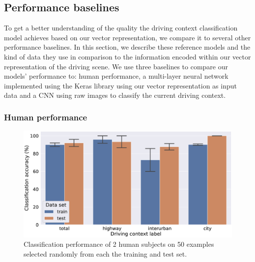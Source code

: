 \subsection{Performance baselines}%
\label{subsec:performance_baselines}

To get a better understanding of the quality the driving context classification model achieves based on our vector representation, we compare it to several other performance baselines.
In this section, we describe these reference models and the kind of data they use in comparison to the information encoded within our vector representation of the driving scene.
We use three baselines to compare our models' performance to: human performance, a multi-layer neural network implemented using the Keras library \parencite{Chollet2015keras} using our vector representation as input data and a \ac{CNN} using raw images to classify the current driving context.

\subsubsection{Human performance}%
\label{ssubsec:human_performance}

\begin{figure}[t]
    \centering
    \includegraphics[width=1.0\linewidth]{imgs/context_class_human_train_test.eps}
    \caption{Classification performance of \num{2} human subjects on \num{50} examples selected randomly from each the training and test set.}
    \label{fig:context_class_human_train_test}
\end{figure}

